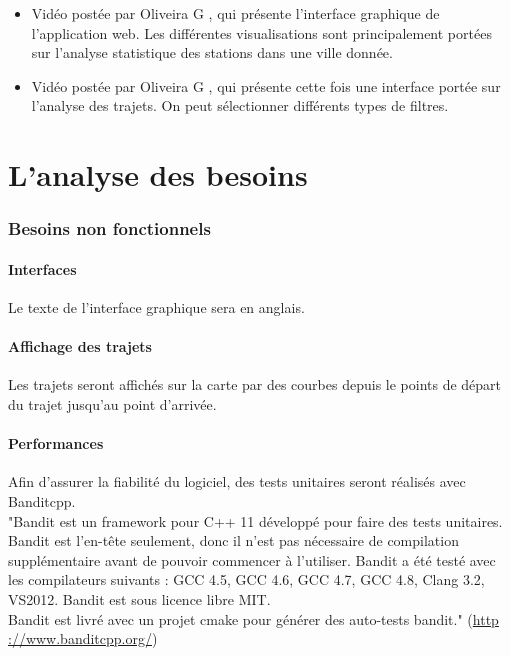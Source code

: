 \documentclass[12pt]{article}
\begin{document}
\begin{itemize}
			\item Vidéo postée par Oliveira G \cite{state_station}, qui présente l'interface
			graphique de l'application web. Les différentes visualisations sont principalement
			portées sur l'analyse statistique des stations dans une ville donnée.

			\item Vidéo postée par Oliveira G \cite{trips}, qui présente cette fois une
			interface portée sur l'analyse des trajets. On peut sélectionner différents types
			de filtres.

		\end{itemize}

\newpage
\part{L'analyse des besoins}
	\section{Besoins non fonctionnels}
		\subsection{Interfaces}
		Le texte de l’interface graphique sera en anglais.

		\subsection{Affichage des trajets}
		Les trajets seront affichés sur la carte par des courbes depuis le points de départ du
		trajet jusqu’au point d’arrivée.

		\subsection{Performances}
		Afin d’assurer la fiabilité du logiciel, des tests unitaires seront réalisés avec
		Banditcpp.\\
		"Bandit est un framework pour C++ 11 développé pour faire des tests unitaires. Bandit est
		l’en-tête seulement, donc il n’est pas nécessaire de compilation supplémentaire avant de
		pouvoir commencer à l’utiliser. Bandit a été testé avec les compilateurs suivants :
		GCC 4.5, GCC 4.6, GCC 4.7, GCC 4.8, Clang 3.2, VS2012.
		Bandit est sous licence libre MIT. \\
		Bandit est livré avec un projet cmake pour générer des auto-tests bandit."
		(\url{http ://www.banditcpp.org/})\\
	
\end{document}

